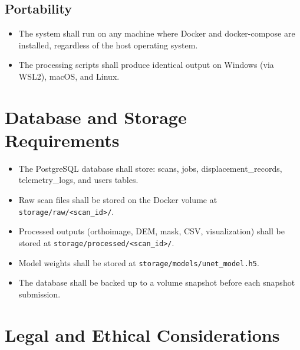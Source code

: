 \documentclass{article}
\begin{document}
\subsection{Portability}
\begin{itemize}
  \item The system shall run on any machine where Docker and docker-compose are
    installed, regardless of the host operating system.
  \item The processing scripts shall produce identical output on Windows (via WSL2),
    macOS, and Linux.
\end{itemize}


\section{Database and Storage Requirements}


\begin{itemize}
  \item The PostgreSQL database shall store: scans, jobs, displacement\_records,
    telemetry\_logs, and users tables.
  \item Raw scan files shall be stored on the Docker volume at
    \texttt{storage/raw/<scan\_id>/}.
  \item Processed outputs (orthoimage, DEM, mask, CSV, visualization) shall be stored
    at \texttt{storage/processed/<scan\_id>/}.
  \item Model weights shall be stored at
    \texttt{storage/models/unet\_model.h5}.
  \item The database shall be backed up to a volume snapshot before each snapshot
    submission.
\end{itemize}


\section{Legal and Ethical Considerations}
\label{sec:legal}
\end{document}
